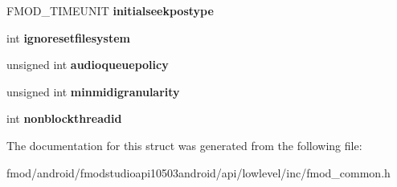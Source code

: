 \begin{DoxyCompactItemize}
\item 
\hypertarget{struct_f_m_o_d___c_r_e_a_t_e_s_o_u_n_d_e_x_i_n_f_o_acb1b8eee3ee0a85e91dbb7a88a74d574}{F\+M\+O\+D\+\_\+\+T\+I\+M\+E\+U\+N\+I\+T {\bfseries initialseekpostype}}\label{struct_f_m_o_d___c_r_e_a_t_e_s_o_u_n_d_e_x_i_n_f_o_acb1b8eee3ee0a85e91dbb7a88a74d574}

\item 
\hypertarget{struct_f_m_o_d___c_r_e_a_t_e_s_o_u_n_d_e_x_i_n_f_o_a6bbfa77595d2a222ab5b51c8163015f9}{int {\bfseries ignoresetfilesystem}}\label{struct_f_m_o_d___c_r_e_a_t_e_s_o_u_n_d_e_x_i_n_f_o_a6bbfa77595d2a222ab5b51c8163015f9}

\item 
\hypertarget{struct_f_m_o_d___c_r_e_a_t_e_s_o_u_n_d_e_x_i_n_f_o_a23344f4eafd6e30b53443c6e63045684}{unsigned int {\bfseries audioqueuepolicy}}\label{struct_f_m_o_d___c_r_e_a_t_e_s_o_u_n_d_e_x_i_n_f_o_a23344f4eafd6e30b53443c6e63045684}

\item 
\hypertarget{struct_f_m_o_d___c_r_e_a_t_e_s_o_u_n_d_e_x_i_n_f_o_accd465df1d73435daae0d2ef87026362}{unsigned int {\bfseries minmidigranularity}}\label{struct_f_m_o_d___c_r_e_a_t_e_s_o_u_n_d_e_x_i_n_f_o_accd465df1d73435daae0d2ef87026362}

\item 
\hypertarget{struct_f_m_o_d___c_r_e_a_t_e_s_o_u_n_d_e_x_i_n_f_o_a99017c1720cfae07e5bd5abacf3ac2a7}{int {\bfseries nonblockthreadid}}\label{struct_f_m_o_d___c_r_e_a_t_e_s_o_u_n_d_e_x_i_n_f_o_a99017c1720cfae07e5bd5abacf3ac2a7}

\end{DoxyCompactItemize}


The documentation for this struct was generated from the following file\+:\begin{DoxyCompactItemize}
\item 
fmod/android/fmodstudioapi10503android/api/lowlevel/inc/fmod\+\_\+common.\+h\end{DoxyCompactItemize}
